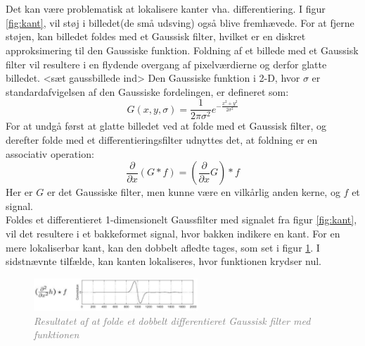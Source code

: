 \\
\\
Det kan være problematisk at lokalisere kanter vha. differentiering. I figur \ref{fig:kant}, vil støj i billedet(de små udsving) også blive fremhævede. For at fjerne støjen, kan billedet foldes med et Gaussisk filter, hvilket er en diskret approksimering til den Gaussiske funktion. Foldning af et billede med et Gaussisk filter vil resultere i en flydende overgang af pixelværdierne og derfor glatte billedet. <sæt gaussbillede ind> Den Gaussiske funktion i 2-D, hvor $ \sigma $ er standardafvigelsen af den Gaussiske fordelingen, er defineret som:
\begin{equation}
G(x,y,\sigma) = \frac{1}{2 \pi \sigma ^{2}} e^{- \frac{x^{2} + y^{2}}{2 \sigma ^{2}}}
\label{2dgaussian}
\end{equation} 
For at undgå først at glatte billedet ved at folde med et Gaussisk filter, og derefter folde med et differentieringsfilter udnyttes det, at foldning er en associativ operation:
\begin{equation}
\dfrac{\partial}{\partial x}(G \ast f) = (\dfrac{\partial}{\partial x}G) \ast f
\end{equation}
Her er $G$ er det Gaussiske filter, men kunne være en vilkårlig anden kerne, og $f$ et signal. 
\\
Foldes et differentieret 1-dimensionelt Gaussfilter med signalet fra figur \ref{fig:kant}, vil det resultere i et bakkeformet signal, hvor bakken indikere en kant. For en mere lokaliserbar kant, kan den dobbelt afledte tages, som set i figur \ref{fig:deriv}. I sidstnævnte tilfælde, kan kanten lokaliseres, hvor funktionen krydser nul.
\begin{figure}[H]
    \centering
    \includegraphics[width=0.55\textwidth]{fig/8.png}
    \vspace{-1em}   
    \begin{center}
    \caption{\textcolor{gray}{\footnotesize \textit{
     Resultatet af at folde et dobbelt differentieret Gaussisk filter med funktionen}}}
    \label{fig:deriv}
     \end{center}
    \vspace{-2.5em}  
  \end{figure}
\noindent


